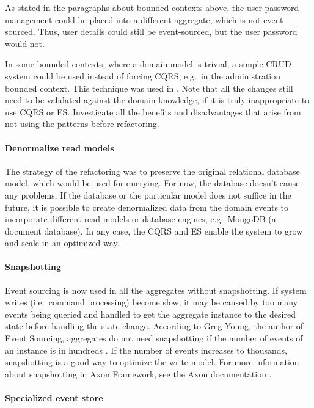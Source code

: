 \documentclass{book}
\begin{document}
As stated in the paragraphs about bounded contexts above, the user
password management could be placed into a different aggregate, which is
not event-sourced. Thus, user details could still be event-sourced, but
the user password would not.

In some bounded contexts, where a domain model is trivial, a simple CRUD
system could be used instead of forcing CQRS, e.g.~in the administration
bounded context. This technique was used in \cite{journey}. Note that
all the changes still need to be validated against the domain knowledge,
if it is truly inappropriate to use CQRS or ES. Investigate all the
benefits and disadvantages that arise from not using the patterns before
refactoring.

\paragraph{Denormalize read models}\label{denormalize-read-models}

The strategy of the refactoring was to preserve the original relational
database model, which would be used for querying. For now, the database
doesn't cause any problems. If the database or the particular model does
not suffice in the future, it is possible to create denormalized data
from the domain events to incorporate different read models or database
engines, e.g.~MongoDB (a document database). In any case, the CQRS and
ES enable the system to grow and scale in an optimized way.

\paragraph{Snapshotting}\label{snapshotting}

Event sourcing is now used in all the aggregates without snapshotting.
If system writes (i.e.~command processing) become slow, it may be caused
by too many events being queried and handled to get the aggregate
instance to the desired state before handling the state change.
According to Greg Young, the author of Event Sourcing, aggregates do not
need snapshotting if the number of events of an instance is in hundreds
\cite{greg-youtube}. If the number of events increases to thousands,
snapshotting is a good way to optimize the write model. For more
information about snapshotting in Axon Framework, see the Axon
documentation \cite{axon-docs}.

\paragraph{Specialized event store}\label{specialized-event-store}
\end{document}
